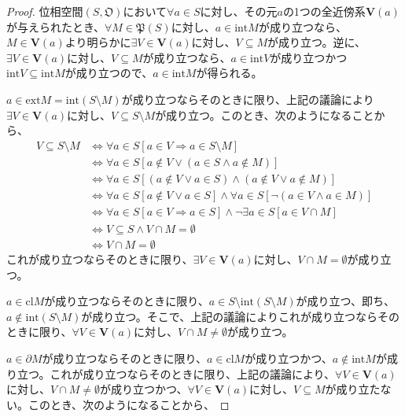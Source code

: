 \documentclass[dvipdfmx]{jsarticle}
\begin{document}
\begin{proof}
位相空間$\left( S,\mathfrak{O} \right)$において$\forall a \in S$に対し、その元$a$の1つの全近傍系$\mathbf{V}(a)$が与えられたとき、$\forall M \in \mathfrak{P}(S)$に対し、$a \in {\mathrm{int}}M$が成り立つなら、$M \in \mathbf{V}(a)$より明らかに$\exists V \in \mathbf{V}(a)$に対し、$V \subseteq M$が成り立つ。逆に、$\exists V \in \mathbf{V}(a)$に対し、$V \subseteq M$が成り立つなら、$a \in {\mathrm{int}}V$が成り立つかつ${\mathrm{int}}V \subseteq {\mathrm{int}}M$が成り立つので、$a \in {\mathrm{int}}M$が得られる。\par
$a \in {\mathrm{ext}}M = {\mathrm{int}}(S \setminus M)$が成り立つならそのときに限り、上記の議論により$\exists V \in \mathbf{V}(a)$に対し、$V \subseteq S \setminus M$が成り立つ。このとき、次のようになることから、
\begin{align*}
V \subseteq S \setminus M &\Leftrightarrow \forall a \in S[ a \in V \Rightarrow a \in S \setminus M]\\
&\Leftrightarrow \forall a \in S\left[ a \notin V \vee (a \in S \land a \notin M) \right]\\
&\Leftrightarrow \forall a \in S\left[ (a \notin V \vee a \in S) \land (a \notin V \vee a \notin M) \right]\\
&\Leftrightarrow \forall a \in S[ a \notin V \vee a \in S] \land \forall a \in S\left[ \neg(a \in V \land a \in M) \right]\\
&\Leftrightarrow \forall a \in S[ a \in V \Rightarrow a \in S] \land \neg\exists a \in S[ a \in V \cap M]\\
&\Leftrightarrow V \subseteq S \land V \cap M = \emptyset\\
&\Leftrightarrow V \cap M = \emptyset
\end{align*}
これが成り立つならそのときに限り、$\exists V \in \mathbf{V}(a)$に対し、$V \cap M = \emptyset$が成り立つ。\par
$a \in {\mathrm{cl}}M$が成り立つならそのときに限り、$a \in S \setminus {\mathrm{int}}(S \setminus M)$が成り立つ、即ち、$a \notin {\mathrm{int}}(S \setminus M)$が成り立つ。そこで、上記の議論によりこれが成り立つならそのときに限り、$\forall V \in \mathbf{V}(a)$に対し、$V \cap M \neq \emptyset$が成り立つ。\par
$a \in \partial M$が成り立つならそのときに限り、$a \in {\mathrm{cl}}M$が成り立つかつ、$a \notin {\mathrm{int}}M$が成り立つ。これが成り立つならそのときに限り、上記の議論により、$\forall V \in \mathbf{V}(a)$に対し、$V \cap M \neq \emptyset$が成り立つかつ、$\forall V \in \mathbf{V}(a)$に対し、$V \subseteq M$が成り立たない。このとき、次のようになることから、

\end{proof}
\end{document}
